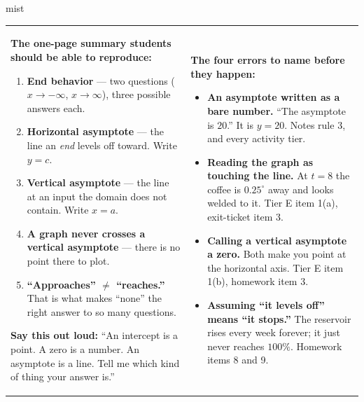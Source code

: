 \documentclass[10pt]{article}
\begin{document}
\boxguard
\begin{skillbox}{mist}
\begin{tabularx}{\linewidth}{@{}X|X@{}}
\begin{minipage}[t]{\linewidth}\vspace{0pt}
\textbf{The one-page summary students should be able to reproduce:}
\begin{enumerate}[leftmargin=1.4em, itemsep=1pt, topsep=2pt]
  \item \textbf{End behavior} --- two questions ($x \to -\infty$, $x \to \infty$), three possible
        answers each.
  \item \textbf{Horizontal asymptote} --- the line an \emph{end} levels off toward. Write $y=c$.
  \item \textbf{Vertical asymptote} --- the line at an input the domain does not contain. Write
        $x=a$.
  \item \textbf{A graph never crosses a vertical asymptote} --- there is no point there to plot.
  \item \textbf{``Approaches'' $\ne$ ``reaches.''} That is what makes ``none'' the right answer to so
        many questions.
\end{enumerate}
\textbf{Say this out loud:} ``An intercept is a point. A zero is a number. An asymptote is a line.
Tell me which kind of thing your answer is.''
\end{minipage}
&
\begin{minipage}[t]{\linewidth}\vspace{0pt}
\textbf{The four errors to name before they happen:}
\begin{itemize}[leftmargin=1.1em, itemsep=2pt, topsep=2pt]
  \item \textbf{An asymptote written as a bare number.} ``The asymptote is $20$.'' It is $y=20$.
        Notes rule 3, and every activity tier.
  \item \textbf{Reading the graph as touching the line.} At $t=8$ the coffee is $0.25^\circ$ away and
        looks welded to it. Tier E item 1(a), exit-ticket item 3.
  \item \textbf{Calling a vertical asymptote a zero.} Both make you point at the horizontal axis.
        Tier E item 1(b), homework item 3.
  \item \textbf{Assuming ``it levels off'' means ``it stops.''} The reservoir rises every week
        forever; it just never reaches $100\%$. Homework items 8 and 9.
\end{itemize}
\end{minipage}
\end{tabularx}
\end{skillbox}
\end{document}
